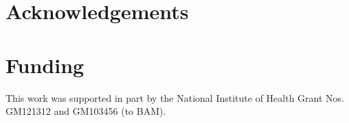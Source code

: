 \documentclass{bioinfo}
\begin{document}
\section*{Acknowledgements}

\section*{Funding}
This work was supported in part by the National Institute of Health Grant Nos. GM121312 and GM103456 (to BAM).



%
%
%
%
%
%
%
%
%
\end{document}
